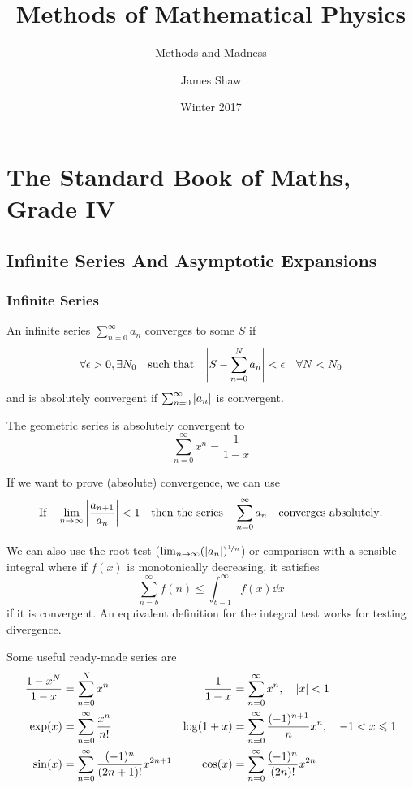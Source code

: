 \documentclass[a4paper,12pt,parskip=full,BCOR=1cm]{scrreprt}
\title{Methods of Mathematical Physics}
\subtitle{Methods and Madness}
\author{James Shaw}
\date{Winter 2017}
\renewcommand{\leq}{\leqslant}
\begin{document}

\tableofcontents
\part{The Standard Book of Maths, Grade IV}
\chapter{Infinite Series And Asymptotic Expansions}
\section{Infinite Series}
An infinite series $\sum_{n=0}^\infty a_n$ converges to some $S$ if $$\forall \epsilon > 0, \exists N_0 \quad\textrm{such that}\quad \abs{S - \sum_{n=0}^N a_n} < \epsilon \quad\forall N< N_0$$ and is absolutely convergent if $\sum_{n=0}^\infty \abs{a_n}$ is convergent.

\begin{example}
 The geometric series is absolutely convergent to $$\sum_{n=0}^\infty x^n = \frac{1}{1-x}$$
\end{example}
If we want to prove (absolute) convergence, we can use
\begin{equation*}
 \textrm{If}\quad\lim_{n\rightarrow \infty}\abs{\frac{a_{n+1}}{a_n}} < 1\quad \textrm{then the series}\quad\sum_{n=0}^\infty a_n \quad \textrm{converges absolutely}.
\end{equation*}

We can also use the root test ($\lim_{n\rightarrow\infty} (\abs{a_n})^{\nicefrac{1}{n}}$) or comparison with a sensible integral where if $f(x)$ is monotonically decreasing, it satisfies
$$ \sum_{n=b}^\infty f(n) \leq \int_{b-1}^\infty f(x)\dd{x} $$ if it is convergent.
An equivalent definition for the integral test works for testing divergence.

\begin{example}
 Some useful ready-made series are
 \begin{align*}
  \frac{1-x^N}{1-x} & = \sum_{n=0}^N x^n                                    & \frac{1}{1-x} & = \sum_{n=0}^\infty x^n,\quad \abs{x} < 1                         \\
  \exp(x)           & = \sum_{n=0}^{\infty} \frac{x^n}{n!}                  & \log(1+x)     & = \sum_{n=0}^{\infty}\frac{(-1)^{n+1}}{n}x^n, \quad -1 < x \leq 1 \\
  \sin(x)           & = \sum_{n=0}^{\infty}\frac{(-1)^{n}}{(2n+1)!}x^{2n+1} & \cos(x)       & = \sum_{n=0}^{\infty}\frac{(-1)^{n}}{(2n)!}x^{2n}
 \end{align*}
\end{example}
\end{document}
